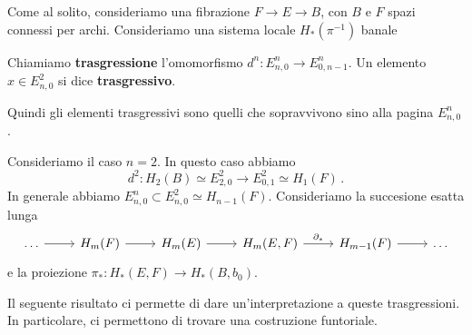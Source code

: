 


Come al solito, consideriamo una fibrazione $F \to E \to B$,
con $B$ e $F$ spazi connessi per archi.
Consideriamo una sistema locale $H_{*}(\pi^{-1})$ banale

\begin{df}
	Chiamiamo \textbf{trasgressione} l'omomorfismo
	$d^{n}:E^{n}_{n,0} \to E^{n}_{0,n-1}$.
	Un elemento $x \in E^{2}_{n,0}$ si dice \textbf{trasgressivo}.
\end{df}

Quindi gli elementi trasgressivi sono quelli che sopravvivono sino alla pagina $E^{n}_{n,0}$.

\begin{rmk}
	Consideriamo il caso $n=2$. In questo caso abbiamo
	\begin{equation*}
		d^{2}: H_{2}(B) \simeq E^{2}_{2,0} \to E^{2}_{0,1} \simeq H_{1}(F)\,.
	\end{equation*}
	In generale abbiamo $E^{n}_{n,0} \subset E^{2}_{n,0} \simeq H_{n-1}(F)$.
	Consideriamo la succesione esatta lunga
	\begin{equation*}
		\begin{tikzcd}
			\dots \ar[r]
			& H_{m}(F) \ar[r]
			& H_{m}(E) \ar[r]
			& H_{m}(E,F) \ar[r, "\de_{*}"]
			& H_{m-1}(F) \ar[r]
			& \dots 
		\end{tikzcd}
	\end{equation*}
	e la proiezione $\pi_{*}:H_{*}(E,F) \to H_{*}(B,b_{0})$.
\end{rmk}

Il seguente risultato ci permette di dare un'interpretazione a queste trasgressioni.
In particolare, ci permettono di trovare una costruzione funtoriale.

